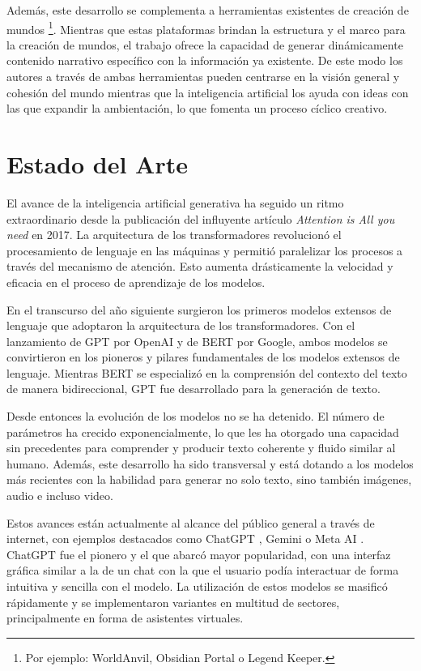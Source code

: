 Además, este desarrollo se complementa a herramientas existentes de creación de mundos
\footnote{Por ejemplo: WorldAnvil, Obsidian Portal o Legend Keeper.}.
Mientras que estas plataformas brindan la estructura y el marco para la creación de mundos,
el trabajo ofrece la capacidad de generar dinámicamente contenido narrativo específico con la información ya existente.
De este modo los autores a través de ambas herramientas pueden centrarse en la visión general y cohesión del mundo mientras que la inteligencia artificial 
los ayuda con ideas con las que expandir la ambientación, lo que fomenta un proceso cíclico creativo.


\section{Estado del Arte}
El avance de la inteligencia artificial generativa ha seguido un ritmo extraordinario desde
la publicación del influyente artículo \textit{Attention is All you need} \cite{att_is_all_you_need}
en 2017.
La arquitectura de los transformadores revolucionó el procesamiento de lenguaje en las máquinas y
permitió paralelizar los procesos a través del mecanismo de atención.
Esto aumenta drásticamente la velocidad y eficacia en el proceso de aprendizaje de los modelos.

En el transcurso del año siguiente surgieron los primeros modelos extensos de lenguaje
que adoptaron la arquitectura de los transformadores.
Con el lanzamiento de GPT \cite{Radford2018GPT1} por OpenAI y de BERT \cite{Devlin2019BERT} por Google, ambos modelos se convirtieron
en los pioneros y pilares fundamentales de los modelos extensos de lenguaje.
Mientras BERT se especializó en la comprensión del contexto del texto de manera bidireccional, GPT
fue desarrollado para la generación de texto.

Desde entonces la evolución de los modelos no se ha detenido. El número de parámetros
ha crecido exponencialmente, lo que les ha otorgado una capacidad sin precedentes para comprender y
producir texto coherente y fluido similar al humano.
Además, este desarrollo ha sido transversal y está dotando a los modelos más recientes 
con la habilidad para generar no solo texto, sino también imágenes, audio e incluso video.

Estos avances están actualmente al alcance del público general a través de internet, con ejemplos destacados
como ChatGPT \cite{OpenAIChatGPT2022}, Gemini \cite{GeminiTeam2023Gemini} o Meta AI \cite{MetaAIAbout}.
ChatGPT fue el pionero y el que abarcó mayor popularidad,
con una interfaz gráfica similar a la de un chat con la que el usuario podía interactuar de forma intuitiva
y sencilla con el modelo. La utilización de estos modelos se masificó rápidamente y se implementaron variantes
en multitud de sectores, principalmente en forma de asistentes virtuales.

